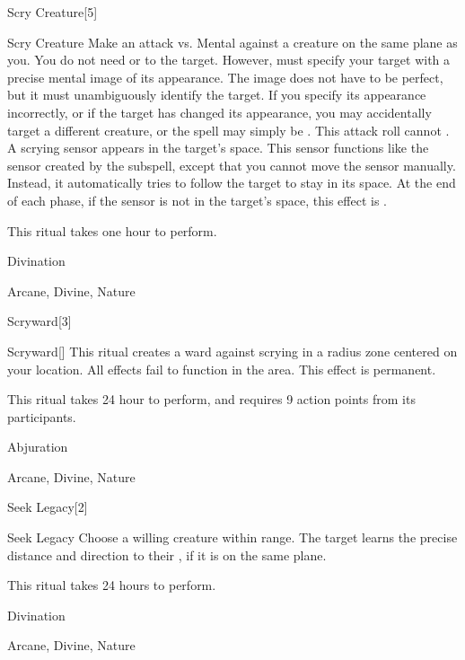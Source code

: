 \begin{spellsection}{Scry Creature}[5]


\begin{ability}{Scry Creature}
Make an attack vs. Mental against a creature on the same plane as you.
You do not need  or  to the target.
However,  must specify your target with a precise mental image of its appearance.
The image does not have to be perfect, but it must unambiguously identify the target.
If you specify its appearance incorrectly, or if the target has changed its appearance, you may accidentally target a different creature, or the spell may simply be .
This attack roll cannot .
\hit A scrying sensor appears in the target's space.
This sensor functions like the sensor created by the  subspell, except that you cannot move the sensor manually.
Instead, it automatically tries to follow the target to stay in its space.
At the end of each phase, if the sensor is not in the target's space, this effect is .

This ritual takes one hour to perform.
\end{ability}




 Divination

 Arcane, Divine, Nature
\end{spellsection}


\begin{spellsection}{Scryward}[3]


\begin{ability}{Scryward}[]
This ritual creates a ward against scrying in a \arealarge radius zone centered on your location.
All  effects fail to function in the area.
This effect is permanent.

This ritual takes 24 hour to perform, and requires 9 action points from its participants.
\end{ability}




 Abjuration

 Arcane, Divine, Nature
\end{spellsection}


\begin{spellsection}{Seek Legacy}[2]


\begin{ability}{Seek Legacy}
Choose a willing creature within \rngclose range.
The target learns the precise distance and direction to their , if it is on the same plane.

This ritual takes 24 hours to perform.
\end{ability}




 Divination

 Arcane, Divine, Nature
\end{spellsection}


